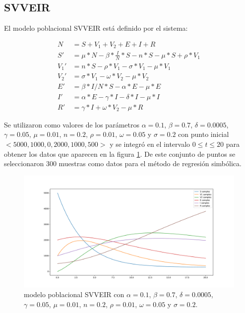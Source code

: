 \subsection{SVVEIR}

El modelo poblacional SVVEIR está definido por el sistema:

\begin{align*}
    N    & = S + V_1 + V_2 + E + I + R                                        \\
    S'   & = \mu * N - \beta * \frac{I}{N} * S - n * S - \mu * S + \rho * V_1 \\
    V_1' & = n * S - \rho * V_1 - \sigma * V_1 - \mu * V_1                    \\
    V_2' & = \sigma * V_1 - \omega * V_2 - \mu * V_2                          \\
    E'   & = \beta * I / N * S - \alpha * E - \mu * E                         \\
    I'   & = \alpha * E - \gamma * I - \delta * I - \mu * I                   \\
    R'   & = \gamma * I + \omega * V_2 - \mu * R
\end{align*}

Se utilizaron como valores de los parámetros $\alpha = 0.1$, $\beta = 0.7$, $\delta = 0.0005$, $\gamma = 0.05$, $\mu = 0.01$, $n = 0.2$, $\rho = 0.01$, $\omega = 0.05$ y $\sigma = 0.2$ con punto inicial $<5000, 1000, 0, 2000, 1000, 500>$ y se integró en el intervalo $0 \leq t \leq 20$ para obtener los datos que aparecen en la figura \ref{fig:SVVEIR}. De este conjunto de puntos se seleccionaron 300 muestras como datos para el método de regresión simbólica.

\begin{figure}[h]
    \centering
    \includegraphics[width=\textwidth]{"figures/SVVEIR.pdf"}
    \caption{modelo poblacional SVVEIR con $\alpha = 0.1$, $\beta = 0.7$, $\delta = 0.0005$, $\gamma = 0.05$, $\mu = 0.01$, $n = 0.2$, $\rho = 0.01$, $\omega = 0.05$ y $\sigma = 0.2$.}
    \label{fig:SVVEIR}
\end{figure}

